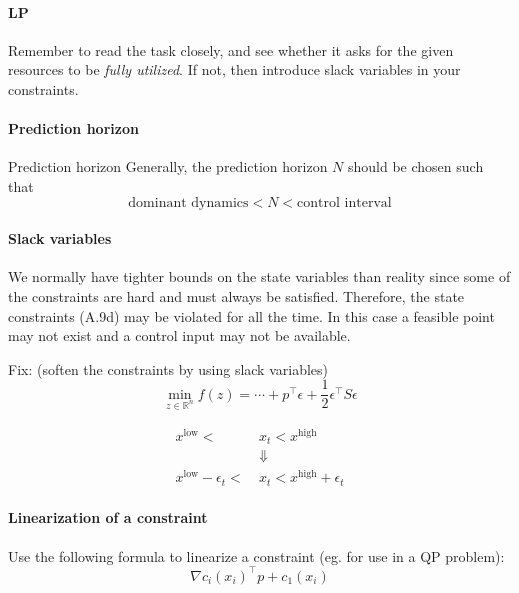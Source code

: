 
\paragraph{LP}
Remember to read the task closely, and see whether it asks for the given resources to be \textit{fully utilized}. If not, then introduce slack variables in your constraints.

\paragraph{Prediction horizon}{Prediction horizon} Generally, the prediction horizon $N$ should be chosen such that
\begin{equation}
    \text{dominant dynamics} < N < \text{control interval}
\end{equation}

\paragraph{Slack variables} We normally have tighter bounds on the state variables than reality since some of the constraints are hard and must always be satisfied. Therefore, the state constraints (A.9d) may be violated for all the time. In this case a feasible point may not exist and a control input may not be available.

Fix: (soften the constraints by using slack variables)
\begin{equation}
    \min_{z \in \mathbb{R}^n} f(z) = \cdots + p^\top \epsilon + \frac{1}{2} \epsilon ^\top S \epsilon
\end{equation}

\begin{equation}
    \begin{split}
        x^{\text{low}} < \:&x_t < x^{\text{high}}\\
        &\Downarrow\\
        x^{\text{low}} - \epsilon_t < \: &x_t < x^{\text{high}} + \epsilon_t
    \end{split}
\end{equation}

\paragraph{Linearization of a constraint}
%
Use the following formula to linearize a constraint (eg. for use in a QP problem):
\begin{equation}
    \nabla c_i(x_i)^\top p + c_1(x_i)
\end{equation}


